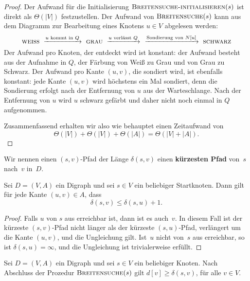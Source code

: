 \begin{proof}
Der Aufwand für die Initialisierung $\mathop{\text{\textsc{Breitensuche-initialisieren}}}(s)$ ist direkt als $\Theta(|V|)$ festzustellen. Der Aufwand von $\mathop{\text{\textsc{Breitensuche}}}(s)$ kann aus dem Diagramm zur Bearbeitung eines Knotens $u \in V$ abgelesen werden: 
\begin{equation*}
	\cc{weiss} 
	\ \xrightarrow{\text{$u$ kommt in $Q$}} \ 
	 \cc{grau}
	 \  \xrightarrow{\text{$u$ verlässt $Q$}} \ 
	 \ \xrightarrow{\text{Sondierung von $N[u]$}}
	\ \cc{schwarz} 
\end{equation*} 
Der Aufwand pro Knoten, der entdeckt wird ist konstant: der Aufwand  besteht aus der Aufnahme in $Q$,  der Färbung von Weiß zu Grau und von Grau zu Schwarz. Der Aufwand pro Kante $(u,v)$, die sondiert wird, ist ebenfalls konstant: jede Kante $(u,v)$ wird höchstens ein Mal sondiert, denn die Sondierung erfolgt nach der Entfernung von $u$ aus der Warteschlange. Nach der Entfernung von $u$ wird $u$ schwarz gefärbt und daher nicht noch einmal in $Q$ aufgenommen. 

Zusammenfassend erhalten wir also  wie behauptet einen Zeitaufwand von
\[
\Theta(|V|) + \Theta(|V|) + \Theta(|A|) = \Theta(|V|+|A|).
\]
\end{proof}


\begin{defn}
Wir nennen einen $(s,v)$-Pfad der Länge $\delta(s,v)$ einen \textbf{kürzesten Pfad} von~$s$ nach~$v$ in~$D$.
\end{defn}

\begin{lem}
\label{lem:breitensuche-pfad-dreieck}
Sei $D=(V,A)$ ein Digraph und sei $s \in V$ ein beliebiger Startknoten.
Dann  gilt für jede Kante $(u,v) \in A$, dass
\[
\delta(s,v) \leq \delta(s,u) + 1.
\]
\end{lem}

\begin{proof}
Falls $u$ von $s$ aus erreichbar ist, dann ist es auch~$v$.
In diesem Fall ist der kürzeste $(s,v)$-Pfad nicht länger als der kürzeste $(s,u)$-Pfad, verlängert um die Kante $(u,v)$, und die Ungleichung gilt.
Ist~$u$ nicht von~$s$ aus erreichbar, so ist $\delta(s,u)=\infty$, und die Ungleichung ist trivialerweise erfüllt.
\end{proof}

\begin{lem}
\label{lem:breitensuche-d-geq-delta}
Sei $D=(V,A)$ ein Digraph und sei $s \in V$ ein beliebiger Knoten.
Nach Abschluss der Prozedur $\mathop{\text{\textsc{Breitensuche}}}(s)$ gilt $d[v] \geq \delta(s,v)$, für alle $v \in V$.
\end{lem}

